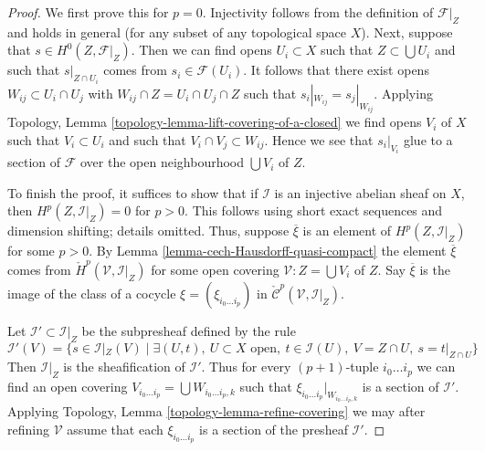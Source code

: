 \begin{proof}
We first prove this for $p = 0$. Injectivity follows from
the definition of $\mathcal{F}|_Z$ and holds in general
(for any subset of any topological space $X$). Next, suppose that
$s \in H^0(Z, \mathcal{F}|_Z)$. Then we can find opens $U_i \subset X$
such that $Z \subset \bigcup U_i$ and such that $s|_{Z \cap U_i}$
comes from $s_i \in \mathcal{F}(U_i)$. It follows that
there exist opens $W_{ij} \subset U_i \cap U_j$ with
$W_{ij} \cap Z = U_i \cap U_j \cap Z$ such that
$s_i|_{W_{ij}} = s_j|_{W_{ij}}$. Applying
Topology, Lemma \ref{topology-lemma-lift-covering-of-a-closed}
we find opens $V_i$ of $X$ such that $V_i \subset U_i$ and
such that $V_i \cap V_j \subset W_{ij}$. Hence we see that
$s_i|_{V_i}$ glue to a section of $\mathcal{F}$ over the
open neighbourhood $\bigcup V_i$ of $Z$.

\medskip\noindent
To finish the proof, it suffices to show that if $\mathcal{I}$ is an
injective abelian sheaf on $X$, then $H^p(Z, \mathcal{I}|_Z) = 0$
for $p > 0$. This follows using short exact sequences and dimension
shifting; details omitted. Thus, suppose $\overline{\xi}$ is an element
of $H^p(Z, \mathcal{I}|_Z)$ for some $p > 0$.
By Lemma \ref{lemma-cech-Hausdorff-quasi-compact}
the element $\overline{\xi}$ comes from
$\check{H}^p(\mathcal{V}, \mathcal{I}|_Z)$
for some open covering $\mathcal{V} : Z = \bigcup V_i$ of $Z$.
Say $\overline{\xi}$ is the image of the class of a cocycle
$\xi = (\xi_{i_0 \ldots i_p})$ in
$\check{\mathcal{C}}^p(\mathcal{V}, \mathcal{I}|_Z)$.

\medskip\noindent
Let $\mathcal{I}' \subset \mathcal{I}|_Z$ be the subpresheaf
defined by the rule
$$
\mathcal{I}'(V) =
\{s \in \mathcal{I}|_Z(V) \mid
\exists (U, t),\ U \subset X\text{ open},
\ t \in \mathcal{I}(U),\ V = Z \cap U,\ s = t|_{Z \cap U} \}
$$
Then $\mathcal{I}|_Z$ is the sheafification of $\mathcal{I}'$.
Thus for every $(p + 1)$-tuple $i_0 \ldots i_p$ we can find an
open covering $V_{i_0 \ldots i_p} = \bigcup W_{i_0 \ldots i_p, k}$
such that $\xi_{i_0 \ldots i_p}|_{W_{i_0 \ldots i_p, k}}$ is
a section of $\mathcal{I}'$. Applying
Topology, Lemma \ref{topology-lemma-refine-covering}
we may after refining $\mathcal{V}$ assume that each
$\xi_{i_0 \ldots i_p}$ is a section of the presheaf $\mathcal{I}'$.


\end{proof}
